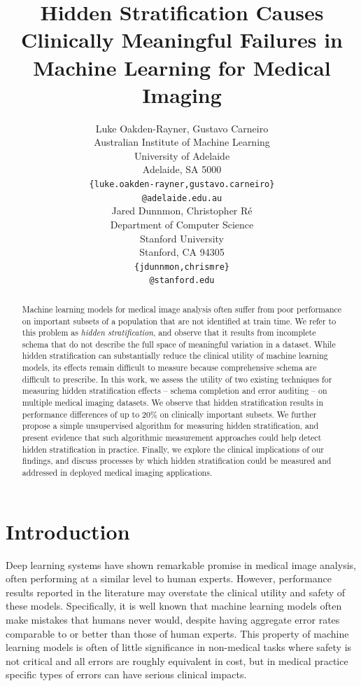 \documentclass{article}
\title{Hidden Stratification Causes Clinically Meaningful Failures in Machine Learning for Medical Imaging
}
\author{%
  Luke Oakden-Rayner, Gustavo Carneiro\\
  Australian Institute of Machine Learning\\
  University of Adelaide\\
  Adelaide, SA 5000 \\
  \texttt{\{luke.oakden-rayner,gustavo.carneiro\}} \\
  \texttt{@adelaide.edu.au} \\
  \And
    Jared Dunnmon,  Christopher R\'{e}\\
  Department of Computer Science\\
  Stanford University\\
  Stanford, CA 94305 \\
  \texttt{\{jdunnmon,chrismre\}} \\
  \texttt{@stanford.edu} 
  }
\begin{document}
\maketitle

\begin{abstract}
Machine learning models for medical image analysis often suffer from poor performance on important subsets of a population that are not identified at train time.  
We refer to this problem as \textit{hidden stratification}, and observe that it results from incomplete schema that do not describe the full space of meaningful variation in a dataset.  
While hidden stratification can substantially reduce the clinical utility of machine learning models, its effects remain difficult to measure because comprehensive schema are difficult to prescribe.
In this work, we assess the utility of two existing techniques for measuring hidden stratification effects -- schema completion and error auditing -- on multiple medical imaging datasets.
We observe that hidden stratification results in performance differences of up to 20\% on clinically important subsets.
We further propose a simple unsupervised algorithm for measuring hidden stratification, and present evidence that such algorithmic measurement approaches could help detect hidden stratification in practice.
Finally, we explore the clinical implications of our findings, and discuss processes by which hidden stratification could be measured and addressed in deployed medical imaging applications. 
\end{abstract}

\section{Introduction}

Deep learning systems have shown remarkable promise in medical image analysis, often performing at a similar level to human experts. 
 However, performance results reported in the literature may overstate the clinical utility and safety of these models.  
 Specifically, it is well known that machine learning models often make mistakes that humans never would, despite having aggregate error rates comparable to or better than those of human experts. 
 This property of machine learning models is often of little significance in non-medical tasks where safety is not critical and all errors are roughly equivalent in cost, but in medical practice specific types of errors can have serious clinical impacts. 
 
\end{document}
